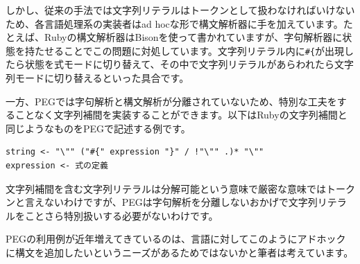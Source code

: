 \begin{Shaded}
\begin{Highlighting}[]
\OtherTok{\#\{}\OtherTok{\#\{}\OtherTok{\}}\OtherTok{\}} 
\end{Highlighting}
\end{Shaded}

しかし、従来の手法では文字列リテラルはトークンとして扱わなければいけないため、各言語処理系の実装者はad
hocな形で構文解析器に手を加えています。たとえば、Rubyの構文解析器はBisonを使って書かれていますが、字句解析器に状態を持たせることでこの問題に対処しています。文字列リテラル内に\texttt{\#\{}が出現したら状態を式モードに切り替えて、その中で文字列リテラルがあらわれたら文字列モードに切り替えるといった具合です。

一方、PEGでは字句解析と構文解析が分離されていないため、特別な工夫をすることなく文字列補間を実装することができます。以下はRubyの文字列補間と同じようなものをPEGで記述する例です。

\begin{verbatim}
string <- "\"" ("#{" expression "}" / !"\"" .)* "\""
expression <- 式の定義
\end{verbatim}

文字列補間を含む文字列リテラルは分解可能という意味で厳密な意味ではトークンと言えないわけですが、PEGは字句解析を分離しないおかげで文字列リテラルをことさら特別扱いする必要がないわけです。

PEGの利用例が近年増えてきているのは、言語に対してこのようにアドホックに構文を追加したいというニーズがあるためではないかと筆者は考えています。

